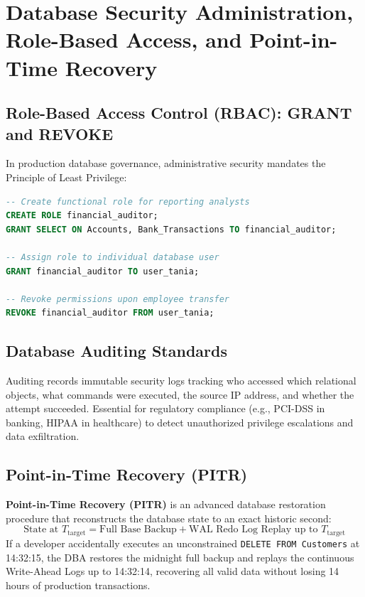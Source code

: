 \section{Database Security Administration, Role-Based Access, and Point-in-Time Recovery}
\label{sec:dbms_security_pitr}

\subsection{Role-Based Access Control (RBAC): GRANT and REVOKE}
In production database governance, administrative security mandates the Principle of Least Privilege:
\begin{lstlisting}[language=SQL]
-- Create functional role for reporting analysts
CREATE ROLE financial_auditor;
GRANT SELECT ON Accounts, Bank_Transactions TO financial_auditor;

-- Assign role to individual database user
GRANT financial_auditor TO user_tania;

-- Revoke permissions upon employee transfer
REVOKE financial_auditor FROM user_tania;
\end{lstlisting}

\subsection{Database Auditing Standards}
Auditing records immutable security logs tracking who accessed which relational objects, what commands were executed, the source IP address, and whether the attempt succeeded. Essential for regulatory compliance (e.g., PCI-DSS in banking, HIPAA in healthcare) to detect unauthorized privilege escalations and data exfiltration.

\subsection{Point-in-Time Recovery (PITR)}
\textbf{Point-in-Time Recovery (PITR)} is an advanced database restoration procedure that reconstructs the database state to an exact historic second:
\begin{equation}
\text{State at } T_{\text{target}} = \text{Full Base Backup} + \text{WAL Redo Log Replay up to } T_{\text{target}}
\end{equation}
If a developer accidentally executes an unconstrained \texttt{DELETE FROM Customers} at 14:32:15, the DBA restores the midnight full backup and replays the continuous Write-Ahead Logs up to 14:32:14, recovering all valid data without losing 14 hours of production transactions.



